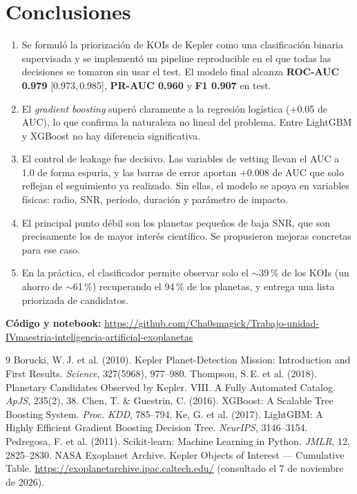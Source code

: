 \documentclass[11pt,a4paper]{article}
\newcommand{\ci}[2]{{\footnotesize[#1,\,#2]}}
\begin{document}
\section{Conclusiones}
\begin{enumerate}
\item Se formuló la priorización de KOIs de Kepler como una clasificación binaria supervisada y se implementó un pipeline reproducible en el que todas las decisiones se tomaron sin usar el test. El modelo final alcanza \textbf{ROC-AUC 0.979} \ci{0.973}{0.985}, \textbf{PR-AUC 0.960} y \textbf{F1 0.907} en test.
\item El \textit{gradient boosting} superó claramente a la regresión logística (+0.05 de AUC), lo que confirma la naturaleza no lineal del problema. Entre LightGBM y XGBoost no hay diferencia significativa.
\item El control de leakage fue decisivo. Las variables de vetting llevan el AUC a 1.0 de forma espuria, y las barras de error aportan +0.008 de AUC que solo reflejan el seguimiento ya realizado. Sin ellas, el modelo se apoya en variables físicas: radio, SNR, período, duración y parámetro de impacto.
\item El principal punto débil son los planetas pequeños de baja SNR, que son precisamente los de mayor interés científico. Se propusieron mejoras concretas para ese caso.
\item En la práctica, el clasificador permite observar solo el $\sim$39\,\% de los KOIs (un ahorro de $\sim$61\,\%) recuperando el 94\,\% de los planetas, y entrega una lista priorizada de candidatos.
\end{enumerate}

\noindent\textbf{Código y notebook:} \url{https://github.com/Cha0smagick/Trabajo-unidad-IVmaestria-inteligencia-artificial-exoplanetas}

\vspace{-4pt}
{\small
\begin{thebibliography}{9}\setlength{\itemsep}{0pt}
 Borucki, W.\,J. et al. (2010). Kepler Planet-Detection Mission: Introduction and First Results. \textit{Science}, 327(5968), 977--980.
 Thompson, S.\,E. et al. (2018). Planetary Candidates Observed by Kepler. VIII. A Fully Automated Catalog. \textit{ApJS}, 235(2), 38.
 Chen, T. \& Guestrin, C. (2016). XGBoost: A Scalable Tree Boosting System. \textit{Proc. KDD}, 785--794.
 Ke, G. et al. (2017). LightGBM: A Highly Efficient Gradient Boosting Decision Tree. \textit{NeurIPS}, 3146--3154.
 Pedregosa, F. et al. (2011). Scikit-learn: Machine Learning in Python. \textit{JMLR}, 12, 2825--2830.
 NASA Exoplanet Archive. Kepler Objects of Interest — Cumulative Table. \url{https://exoplanetarchive.ipac.caltech.edu/} (consultado el 7 de noviembre de 2026).
\end{thebibliography}}
\end{document}
